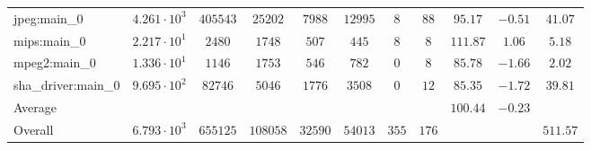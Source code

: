 \begin{tabular}{|l|c|c|c|c|c|c|c|c|c|c|}
jpeg:main\_0            & $ 4.261 \cdot 10^{3}  $ & $ 405543 $ & $ 25202  $ & $ 7988  $ & $ 12995 $ & $ 8   $ & $ 88  $ & $ 95.17       $ & $ -0.51   $ & $ 41.07   $ \\
mips:main\_0            & $ 2.217 \cdot 10^{1}  $ & $ 2480   $ & $ 1748   $ & $ 507   $ & $ 445   $ & $ 8   $ & $ 8   $ & $ 111.87      $ & $ 1.06    $ & $ 5.18    $ \\
mpeg2:main\_0           & $ 1.336 \cdot 10^{1}  $ & $ 1146   $ & $ 1753   $ & $ 546   $ & $ 782   $ & $ 0   $ & $ 8   $ & $ 85.78       $ & $ -1.66   $ & $ 2.02    $ \\
sha\_driver:main\_0     & $ 9.695 \cdot 10^{2}  $ & $ 82746  $ & $ 5046   $ & $ 1776  $ & $ 3508  $ & $ 0   $ & $ 12  $ & $ 85.35       $ & $ -1.72   $ & $ 39.81   $ \\
\hline
Average                 & $                     $ & $        $ & $        $ & $       $ & $       $ & $     $ & $     $ & $ 100.44      $ & $ -0.23   $ & $         $ \\
\hline
Overall                 & $ 6.793 \cdot 10^{3}  $ & $ 655125 $ & $ 108058 $ & $ 32590 $ & $ 54013 $ & $ 355 $ & $ 176 $ & $             $ & $         $ & $ 511.57  $ \\
\hline
\end{tabular}
